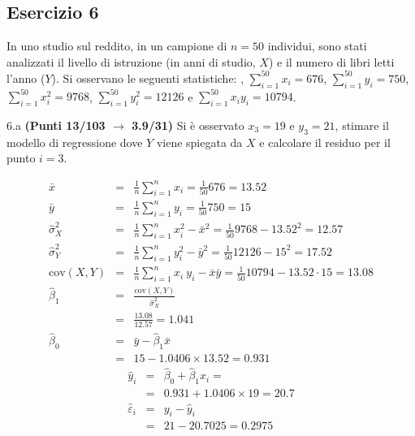 \documentclass[
  11pt,
]{book}
\theoremstyle{mytheoremstyle}
\theoremstyle{mydefstyle}
\newenvironment{sol}
  {
  \begin{tcolorbox}[enhanced,breakable,arc=0.1mm,boxrule=1pt,colback=white,colframe=iblue,
  title=\bf \fontfamily{lmss}\selectfont \hspace{.5 cm} Soluzione,drop fuzzy shadow]

}{
\end{tcolorbox}
  }
\begin{document}
\subsection{Esercizio 6}\label{esercizio-6-31}

In uno studio sul reddito, in un campione di \(n=50\) individui, sono stati analizzati il livello di istruzione (in anni di studio, \(X\)) e il numero di libri letti l'anno (\(Y\)).
Si osservano le seguenti statistiche:
, \(\sum_{i=1}^{50}x_i=676\), \(\sum_{i=1}^{50}y_i=750\),
\(\sum_{i=1}^{50}x_i^2=9768\), \(\sum_{i=1}^{50}y_i^2=12126\) e \(\sum_{i=1}^{50}x_iy_i=10794\).

6.a \textbf{(Punti 13/103 \(\rightarrow\) 3.9/31)} Si è osservato \(x_3=19\) e \(y_3=21\), stimare il modello di regressione dove \(Y\) viene spiegata da \(X\) e calcolare il residuo per il punto \(i=3\).

\begin{sol}
\begin{eqnarray*}
           \bar x &=&\frac 1 n\sum_{i=1}^n x_i = \frac {1}{ 50 }  676 =  13.52 \\
           \bar y &=&\frac 1 n\sum_{i=1}^n y_i = \frac {1}{ 50 }  750 =  15 \\
           \hat\sigma_X^2&=&\frac 1 n\sum_{i=1}^n x_i^2-\bar x^2=\frac {1}{ 50 }  9768  - 13.52 ^2= 12.57 \\
           \hat\sigma_Y^2&=&\frac 1 n\sum_{i=1}^n y_i^2-\bar y^2=\frac {1}{ 50 }  12126  - 15 ^2= 17.52 \\
           \text{cov}(X,Y)&=&\frac 1 n\sum_{i=1}^n x_i~y_i-\bar x\bar y=\frac {1}{ 50 }  10794 - 13.52 \cdot 15 = 13.08 \\
           \hat\beta_1 &=& \frac{\text{cov}(X,Y)}{\hat\sigma_X^2} \\
                    &=& \frac{ 13.08 }{ 12.57 }  =  1.041 \\
           \hat\beta_0 &=& \bar y - \hat\beta_1 \bar x\\
                    &=&  15 - 1.0406 \times  13.52 = 0.931 
         \end{eqnarray*}\begin{eqnarray*}
\hat y_i &=&\hat\beta_0+\hat\beta_1 x_i=\\ 
&=& 0.931 + 1.0406 \times 19 = 20.7 \\ 
\hat \varepsilon_i &=& y_i-\hat y_i\\ 
&=& 21 - 20.7025 = 0.2975  
\end{eqnarray*}

\end{sol}
\end{document}
